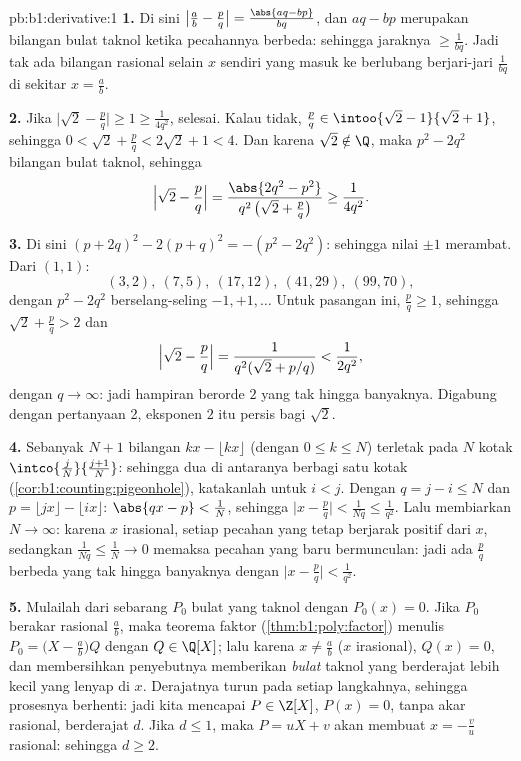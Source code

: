 \begin{solution}{pb:b1:derivative:1}
\textbf{1.} Di sini $\bigl|\frac ab - \frac pq\bigr| = \frac{\abs{aq -
bp}}{bq}$, dan $aq - bp$ merupakan bilangan bulat taknol ketika pecahannya
berbeda: sehingga jaraknya $\geq \frac{1}{bq}$. Jadi tak ada bilangan rasional
selain $x$ sendiri yang masuk ke  berlubang berjari-jari
$\frac{1}{bq}$ di sekitar $x = \frac ab$.

\textbf{2.} Jika $\bigl|\sqrt2 - \frac pq\bigr| \geq 1 \geq
\frac{1}{4q^2}$, selesai. Kalau tidak, $\frac pq \in \intoo{\sqrt2 -
1}{\sqrt2 + 1}$, sehingga $0 < \sqrt2 + \frac pq < 2\sqrt2 + 1 < 4$.
Dan karena $\sqrt 2 \notin \Q$, maka $p^2 - 2q^2$ bilangan bulat taknol, sehingga
\[
\Bigl|\sqrt2 - \frac pq\Bigr|
= \frac{\abs{2q^2 - p^2}}{q^2\,\bigl(\sqrt2 + \frac pq\bigr)}
\geq \frac{1}{4q^2} .
\]

\textbf{3.} Di sini $(p + 2q)^2 - 2(p + q)^2 = -(p^2 - 2q^2)$: sehingga nilai
$\pm1$ merambat. Dari $(1,1)$:
\[
(3,2),\ (7,5),\ (17,12),\ (41,29),\ (99,70),
\]
dengan $p^2 - 2q^2$ berselang-seling $-1, +1, \dots$
Untuk pasangan ini, $\frac pq \geq 1$, sehingga $\sqrt2 + \frac pq > 2$ dan
\[
\Bigl|\sqrt2 - \frac pq\Bigr| =
\frac{1}{q^2(\sqrt2 + p/q)} < \frac{1}{2q^2} ,
\]
dengan $q \to \infty$: jadi hampiran berorde $2$ yang tak hingga banyaknya.
Digabung dengan pertanyaan 2, eksponen $2$ itu persis bagi $\sqrt 2$.

\textbf{4.} Sebanyak $N + 1$ bilangan $kx - \lfloor kx\rfloor$ (dengan $0
\leq k \leq N$) terletak pada $N$ kotak $\intco{\frac
jN}{\frac{j+1}{N}}$: sehingga dua di antaranya berbagi satu kotak
(\cref{cor:b1:counting:pigeonhole}), katakanlah untuk $i < j$. Dengan $q =
j - i \leq N$ dan $p = \lfloor jx\rfloor - \lfloor ix\rfloor$:
$\abs{qx - p} < \frac1N$, sehingga $\bigl|x - \frac pq\bigr| <
\frac{1}{Nq} \leq \frac{1}{q^2}$. Lalu membiarkan $N \to \infty$: karena
$x$ irasional, setiap pecahan yang tetap berjarak positif dari
$x$, sedangkan $\frac{1}{Nq} \leq \frac 1N \to 0$ memaksa pecahan
yang baru bermunculan: jadi ada $\frac pq$ berbeda yang tak hingga banyaknya dengan
$\bigl|x - \frac pq\bigr| < \frac{1}{q^2}$.

\textbf{5.} Mulailah dari sebarang $P_0$ bulat yang taknol dengan $P_0(x) =
0$. Jika $P_0$ berakar rasional $\frac ab$, maka teorema faktor
(\cref{thm:b1:poly:factor}) menulis $P_0 = \bigl(X - \frac
ab\bigr)Q$ dengan $Q \in \Q[X]$;
lalu karena $x \neq \frac ab$ ($x$ irasional), $Q(x) = 0$, dan
membersihkan penyebutnya memberikan  \emph{bulat} taknol
yang berderajat lebih kecil yang lenyap di $x$. Derajatnya turun pada setiap
langkahnya, sehingga prosesnya berhenti: jadi kita mencapai $P \in \Z[X]$, $P(x) = 0$,
tanpa akar rasional, berderajat $d$. Jika $d \leq 1$, maka $P =
uX + v$ akan membuat $x = -\frac vu$ rasional: sehingga $d \geq 2$.


\end{solution}
